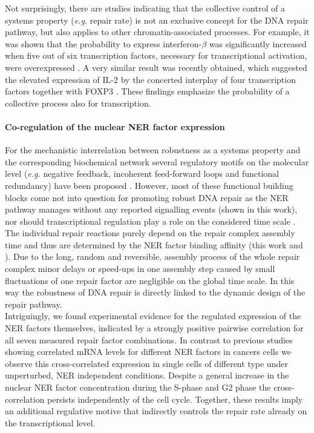 Not surprisingly, there are studies indicating that the collective control of a systems property (\textit{e.g.} repair rate) is not an exclusive concept for the DNA repair pathway, but also applies to other chromatin-associated processes. For example, it was shown that the probability to express interferon-$\beta$ was significantly increased when five out of six transcription factors, necessary for transcriptional activation, were overexpressed \cite{Apostolou2008}. A very similar result was recently obtained, which suggested the elevated expression of IL-2 by the concerted interplay of four transcription factors together with FOXP3 \cite{Bendfeldt2012}. These findings emphasize the probability of a collective process also for transcription.   



\paragraph{Co-regulation of the nuclear NER factor expression}
For the mechanistic interrelation between robustness as a systems property and the corresponding biochemical network several regulatory motifs on the molecular level (\textit{e.g.} negative feedback, incoherent feed-forward loops and functional redundancy) have been proposed \cite{Alon2007,Bleris2011,Yi2000,Manuscript2011}. However, most of these functional building blocks come not into question for promoting robust DNA repair as the NER pathway manages without any reported signalling events (shown in this work), nor should transcriptional regulation play a role on the considered time scale \cite{Mone2001}. The individual repair reactions purely depend on the repair complex assembly time and thus are determined by the NER factor binding affinity (this work and \cite{Luijsterburg2010}). Due to the long, random and reversible, assembly process of the whole repair complex minor delays or speed-ups in one assembly step caused by small fluctuations of one repair factor are negligible on the global time scale. In this way the robustness of DNA repair is directly linked to the dynamic design of the repair pathway.\\     
Intriguingly, we found experimental evidence for the regulated expression of the NER factors themselves, indicated by a strongly positive pairwise correlation for all seven measured repair factor combinations. In contrast to previous studies showing correlated mRNA levels for different NER factors in cancers cells \cite{Damia1998,Cheng2000} we observe this cross-correlated expression in single cells of different type under unperturbed, NER independent conditions. Despite a general increase in the nuclear NER factor concentration during the S-phase and G2 phase the cross-correlation persists independently of the cell cycle. Together, these results imply an additional regulative motive that indirectly controls the repair rate already on the transcriptional level.\\
